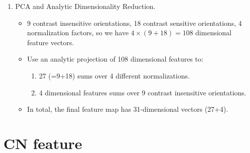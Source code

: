 \documentclass[12pt]{article}
\numberwithin{equation}{section}
\begin{document}
\begin{enumerate}
	\item PCA and Analytic Dimensionality Reduction.
		\begin{itemize}
			\item 9 contrast insensitive orientations, 18 contrast sensitive orientations, 4 normalization factors, 
			so we have $4 \times (9+18)=108$ dimensional feature vectors. 
			\item Use an analytic projection of 108 dimensional features to:
				\begin{enumerate}
			 		\item 27 (=9+18) sums over 4 different normalizations.
					\item 4 dimensional features sums over 9 contrast insensitive orientations. 
				\end{enumerate}
			\item In total, the final feature map has 31-dimensional vectors (27+4).
		\end{itemize}	
\end{enumerate}
\section{CN feature \citep{van2007learning}}
\end{document}
